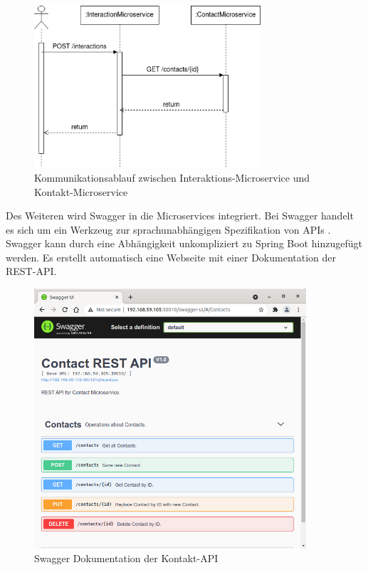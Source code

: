 \begin{figure}[H] 
    \centering
    \includegraphics[width=0.75\textwidth]{figures/UMLSequenzdiagramm.png}
    \caption{Kommunikationsablauf zwischen Interaktions-Microservice und Kontakt-Microservice}
\end{figure}

Des Weiteren wird Swagger in die Microservices integriert. Bei Swagger handelt es sich um ein Werkzeug zur sprachunabhängigen Spezifikation von \acp{API} \parencite[vgl.][]{smartbearsoftwareSwagger2022}. Swagger kann durch eine Abhängigkeit unkompliziert zu Spring Boot hinzugefügt werden. Es erstellt automatisch eine Webseite mit einer Dokumentation der \ac{REST}-\ac{API}. 

\begin{figure}[H] 
    \centering
    \includegraphics[width=0.9\textwidth]{figures/KontaktAPISwagger.png}
    \caption{Swagger Dokumentation der Kontakt-API}
\end{figure}

